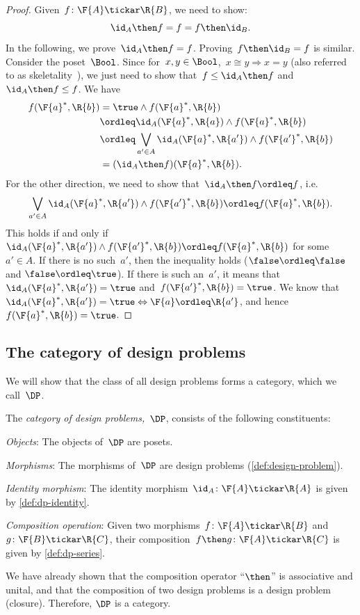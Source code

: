 \begin{proof}
Given~$f\colon \F{A}\tickar \R{B}$, we need to show:
\begin{equation}
    \id_A \then f= f = f\then \id_B.
\end{equation}
In the following, we prove~$\id_A \then f = f$. Proving~$f\then \id_B=f$ is similar.
Consider the poset~$\Bool$. Since for~$x,y\in \Bool$,~$x\cong y \Rightarrow x=y$ (also referred to as skeletality~\cite{fong2019}), we just need to show that~$f\leq \id_A\then f$ and~$\id_A\then f\leq f$.
We have
\begin{equation}
\begin{aligned}
        f(\F{a}^*,\R{b})&=\true \wedge f(\F{a}^*,\R{b})\\
        &\ordleq \id_A(\F{a}^*,\R{a}) \wedge f(\F{a}^*,\R{b})\\
        &\ordleq \bigvee_{a'\in A}\id_A(\F{a}^*,\R{a'})\wedge f(\F{a'}^*,\R{b})\\
        &=(\id_A\then f)(\F{a}^*,\R{b}).
\end{aligned}
\end{equation}
For the other direction, we need to show that~$\id_A\then f\ordleq f$, i.e.
\begin{equation}
    \bigvee_{a'\in A}\id_A(\F{a}^*,\R{a'})\wedge f(\F{a'}^*,\R{b}) \ordleq f(\F{a}^*,\R{b}).
\end{equation}
This holds if and only if~$\id_A(\F{a}^*,\R{a'})\wedge f(\F{a'}^*,\R{b}) \ordleq f(\F{a}^*,\R{b})$ for some~$a'\in A$. If there is no such~$a'$, then the inequality holds ($\false \ordleq \false$ and $\false \ordleq \true$). If there is such an~$a'$, it means that~$\id_A(\F{a}^*,\R{a'})=\true$ and~$f(\F{a'}^*,\R{b})=\true$. We know that~$\id_A(\F{a}^*,\R{a'})=\true \Leftrightarrow \F{a}\ordleq \R{a'}$, and hence~$f(\F{a}^*,\R{b})=\true$.
\end{proof}

\subsection{The category of design problems}

We will show that the class of all design problems forms a category, which we call~$\DP$.

\begin{definition}[Category $\DP$]
\label{define:DP}
The \emph{category of design problems,~$\DP$}, consists of the following constituents:
%
\begin{compactenum}
\item \emph{Objects}: The objects of~$\DP$ are posets.
\item \emph{Morphisms}: The morphisms of~$\DP$ are design problems (\cref{def:design-problem}).
\item \emph{Identity morphism}: The identity morphism~$\id_A \colon \F{A} \tickar \R{A}$ is given by \cref{def:dp-identity}.
\item \emph{Composition operation}: Given two morphisms~$f \colon  \F{A} \tickar \R{B}$ and~$g \colon \F{B} \tickar \R{C}$, their
composition~$f\then g\colon  \F{A} \tickar \R{C}$ is
given by \cref{def:dp-series}.
\end{compactenum}
\end{definition}

We have already shown that the composition operator ``$\then$'' is associative and unital, and that the composition of two design problems is a design problem (closure). Therefore, $\DP$ is a category.
